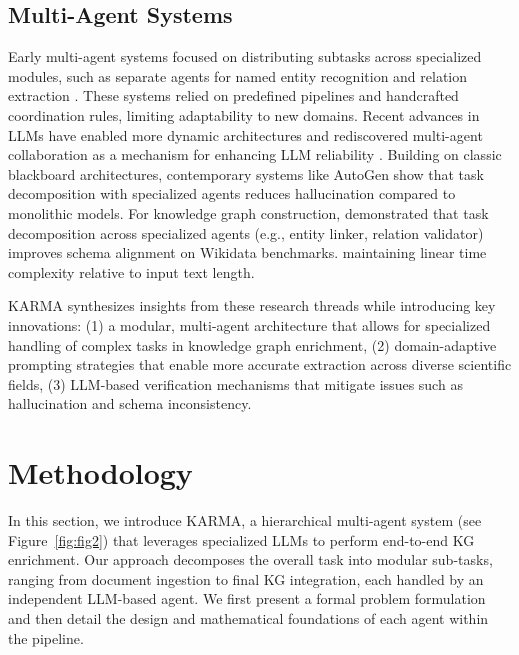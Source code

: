 \documentclass{article}
\begin{document}
\subsection{Multi-Agent Systems}
Early multi-agent systems focused on distributing subtasks across specialized modules, such as separate agents for named entity recognition and relation extraction \cite{carvalho1998multi}. These systems relied on predefined pipelines and handcrafted coordination rules, limiting adaptability to new domains. Recent advances in LLMs have enabled more dynamic architectures and rediscovered multi-agent collaboration as a mechanism for enhancing LLM reliability \cite{talebirad2023multi,lu2024clinicalrag}. Building on classic blackboard architectures, contemporary systems like AutoGen \cite{wu2023autogen} show that task decomposition with specialized agents reduces hallucination compared to monolithic models. For knowledge graph construction, \cite{liang2023encouraging} demonstrated that task decomposition across specialized agents (e.g., entity linker, relation validator) improves schema alignment on Wikidata benchmarks. maintaining linear time complexity relative to input text length.

KARMA synthesizes insights from these research threads while introducing key innovations: (1) a modular, multi-agent architecture that allows for specialized handling of complex tasks in knowledge graph enrichment, (2) domain-adaptive prompting strategies that enable more accurate extraction across diverse scientific fields, (3) LLM-based verification mechanisms that mitigate issues such as hallucination and schema inconsistency. 

\section{Methodology}

In this section, we introduce KARMA, a hierarchical multi-agent system (see Figure~\ref{fig:fig2}) that leverages specialized LLMs to perform end-to-end KG enrichment. Our approach decomposes the overall task into modular sub-tasks, ranging from document ingestion to final KG integration, each handled by an independent LLM-based agent. We first present a formal problem formulation and then detail the design and mathematical foundations of each agent within the pipeline.
\end{document}
